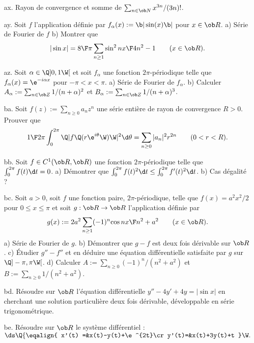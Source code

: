 \exo [Level=2,Fight=0,Learn=0,Field=\SériesEntières,Type=\Exercices,Origin=] ax. 
Rayon de convergence et somme de $\sum_{n\in\ob N}x^{3n}/(3n)!$. 

\exo [Level=2,Fight=0,Learn=0,Field=\SériesDeFourier,Type=\Exercices,Origin=] ay. 
Soit $f$ l'application 
définie par $f_\alpha(x):=\b|\sin (x)\b|$ pour $x\in\ob R$. \pn
a) Série de Fourier de $f$ \pn
b) Montrer que 
$$
|\sin x|={8\F\pi}\sum_{n\ge1}{\sin^2nx\F4n^2-1}\qquad(x\in\ob R).
$$

\exo [Level=2,Fight=1,Learn=0,Field=\SériesDeFourier,Type=\Exercices,Origin=] az. 
Soit $\alpha\in\Q]0,1\W[$ et soit $f_\alpha$ une fonction 
$2\pi$-périodique telle que $f_\alpha(x)=\e^{-i\alpha x}$ pour $-\pi<x<\pi$. \pn
a) Série de Fourier de $f_\alpha$. \pn
b) Calculer $A_\alpha:=\sum_{n\in\ob Z}1/(n+\alpha)^2$ et $B_\alpha:=\sum_{n\in\ob Z}1/(n+\alpha)^3$.

\exo [Level=2,Fight=1,Learn=0,Field=\SériesEntières,Type=\Exercices,Origin=] ba. 
Soit $f(z):=\sum_{n\ge0}a_nz^n$ une série entière de rayon de convergence $R>0$. Prouver que 
$$
{1\F2\pi}\int_0^{2\pi}\Q|f\Q(r\e^{i\theta}\W)\W|^2\d\theta=\sum_{n\ge0}|a_n|^2r^{2n}\qquad(0<r<R).
$$

\exo [Level=2,Fight=1,Learn=1,Field=\SériesDeFourier,Type=\Exercices,Origin=] bb. 
Soit $f\in\sc C^1(\ob R,\ob R)$ une fonction $2\pi$-périodique 
telle que $\int_0^{2\pi}f(t)\d t=0$. \pn
a) Démontrer que $\int_0^{2\pi}f(t)^2\d t\le \int_0^{2\pi}f'(t)^2\d t$. \pn
b) Cas dégalité ?

\exo [Level=2,Fight=2,Learn=1,Field=\SériesDeFonctions,Type=\Exercices,Origin=] bc. 
Soit $a>0$, soit $f$ une fonction paire, $2\pi$-périodique, telle que $f(x)=a^2x^2/2$ pour $0\le x\le \pi$ 
et soit $g:\ob R\to\ob R$ l'application définie par 
$$
g(x):=2a^2\sum_{n\ge1}(-1)^n{\cos nx\F n^2+a^2}\qquad(x\in\ob R).
$$ 
a) Série de Fourier de $g$. \pn
b) Démontrer que $g-f$ est deux fois dérivable sur $\ob R$. \pn
c) \'Etudier $g''-f''$ et en déduire une équation différentielle 
satisfaite par $g$ sur $\Q]-\pi,\pi\W[$. \pn
d) Calculer $A:=\sum_{n\ge0}(-1)^n/(n^2+a^2)$ et $B:=\sum_{n\ge0}1/(n^2+a^2)$. 

\exo [Level=2,Fight=1,Learn=1,Field=\SériesDeFourier,Type=\Exercices,Origin=,Indication=Utiliser le résultat a) de l'exercice \eqrefn{labelexoPTay}.] bd. 
Résoudre sur $\ob R$ l'équation différentielle $y''-4y'+4y=|\sin x|$ 
en cherchant une solution particulière deux fois dérivable, 
développable en série trigonométrique. 


\exo [Level=2,Fight=1,Learn=0,Field=\SystèmesDifférentiels,Type=\Exercices,Origin=] be. 
Résoudre sur $\ob R$ le système différentiel : 
$\ds \Q\{\eqalign{
x'(t)
=&x(t)-y(t)+\e^{2t}\cr
y'(t)=&x(t)+3y(t)+t
}\W.
$

